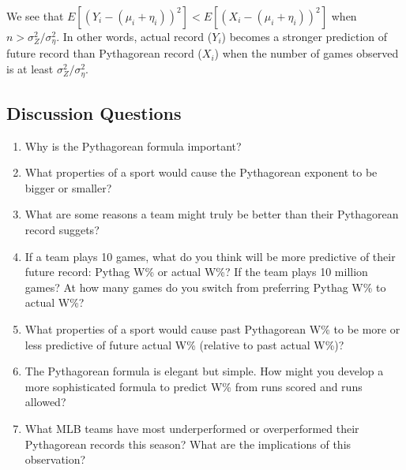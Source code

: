 \documentclass{article}
\begin{document}
      We see that $E[(Y_i - (\mu_i + \eta_i))^2] < E[(X_i - (\mu_i + \eta_i))^2]$ when $n > \sigma^2_Z / \sigma^2_\eta$. In other words, actual record ($Y_i$) becomes a stronger prediction of future record than Pythagorean record ($X_i$) when the number of games observed is at least $\sigma^2_Z / \sigma^2_\eta$.

    \subsection{\sc Discussion Questions}

      \begin{enumerate}
        \item Why is the Pythagorean formula important?
        \item What properties of a sport would cause the Pythagorean exponent to be bigger or smaller?
        \item What are some reasons a team might truly be better than their Pythagorean record suggets?
        \item If a team plays 10 games, what do you think will be more predictive of their future record: Pythag W\% or actual W\%? If the team plays 10 million games? At how many games do you switch from preferring Pythag W\% to actual W\%?
        \item What properties of a sport would cause past Pythagorean W\% to be more or less predictive of future actual W\% (relative to past actual W\%)?
        \item The Pythagorean formula is elegant but simple. How might you develop a more sophisticated formula to predict W\% from runs scored and runs allowed?
        \item What MLB teams have most underperformed or overperformed their Pythagorean records this season? What are the implications of this observation?
      \end{enumerate}
\end{document}
